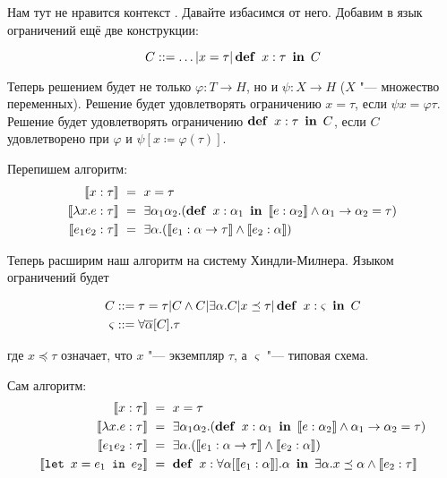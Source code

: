 Нам тут не нравится контекст \todo. Давайте избасимся от него.
Добавим в язык ограничений ещё две конструкции:
\begin{bnf}
\[
    C ::= \ldots | x = \tau | \mathinner\mathbf{def}~x : \tau~\mathinner\mathbf{in}~C
\]
\end{bnf}%
Теперь решением будет не только $\varphi : T \rightarrow H$, но и $\psi : X \rightarrow H$ ($X$ "--- множество переменных).
Решение будет удовлетворять ограничению $x = \tau$, если $\psi x = \varphi \tau$.
Решение будет удовлетворять ограничению $\mathinner\mathbf{def}~x:\tau~\mathinner\mathbf{in}~C$, если $C$ удовлетворено при $\varphi$ и $\psi[x \coloneqq \varphi(\tau)]$.

Перепишем алгоритм:
\begin{align*}
    \restr{x : \tau} \ &=\  x = \tau \\
    \restr{\lambda x . e : \tau} \ &=\ 
        \exists \alpha_1 \alpha_2 . (\deff{x : \alpha_1}{\restr{e:\alpha_2}} \land \alpha_1\rightarrow\alpha_2=\tau) \\
    \restr{e_1 e_2 : \tau} \ &=\ 
        \exists\alpha.(\restr{e_1 :\alpha\rightarrow\tau} \land \restr{e_2 : \alpha})
\end{align*}

Теперь расширим наш алгоритм на систему Хиндли-Милнера. Языком ограничений будет
\begin{bnf}
\begin{align*}
    C &::= \tau = \tau | C \land C | \exists \alpha . C | x \preceq \tau | \mathinner\mathbf{def}~x : \varsigma~\mathinner\mathbf{in}~C \\
    \varsigma &::= \forall \overline\alpha[C] . \tau
\end{align*}
\end{bnf}%
где $x \preceq \tau$ означает, что $x$ "--- экземпляр $\tau$, а $\varsigma$ "--- типовая схема.

Сам алгоритм:
\begin{align*}
    \restr{x : \tau} \ &=\  x = \tau \\
    \restr{\lambda x . e : \tau} \ &=\ 
        \exists \alpha_1 \alpha_2 . (\deff{x : \alpha_1}{\restr{e:\alpha_2}} \land \alpha_1\rightarrow\alpha_2=\tau) \\
    \restr{e_1 e_2 : \tau} \ &=\ 
        \exists\alpha.(\restr{e_1 :\alpha\rightarrow\tau} \land \restr{e_2 : \alpha}) \\
    \restr{\lett{x = e_1}{e_2}} \ &=\ \deff{x : \forall \alpha[\restr{e_1 : \alpha}].\alpha}
        {\exists \alpha . x \preceq \alpha \land \restr{e_2:\tau}}
\end{align*}
\todo

